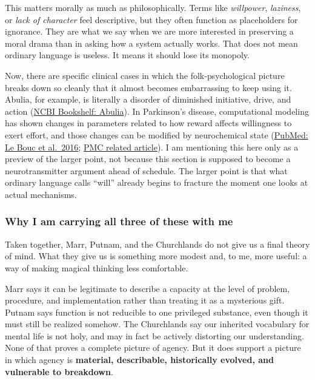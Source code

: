 This matters morally as much as philosophically. Terms like \emph{willpower}, \emph{laziness}, or \emph{lack of character} feel descriptive, but they often function as placeholders for ignorance. They are what we say when we are more interested in preserving a moral drama than in asking how a system actually works. That does not mean ordinary language is useless. It means it should lose its monopoly.

Now, there are specific clinical cases in which the folk-psychological picture breaks down so cleanly that it almost becomes embarrassing to keep using it. Abulia, for example, is literally a disorder of diminished initiative, drive, and action (\href{https://www.ncbi.nlm.nih.gov/books/NBK537093/}{NCBI Bookshelf: Abulia}). In Parkinson's disease, computational modeling has shown changes in parameters related to how reward affects willingness to exert effort, and those changes can be modified by neurochemical state (\href{https://pubmed.ncbi.nlm.nih.gov/27335396/}{PubMed: Le Bouc et al.~2016}; \href{https://pmc.ncbi.nlm.nih.gov/articles/PMC6601748/}{PMC related article}). I am mentioning this here only as a preview of the larger point, not because this section is supposed to become a neurotransmitter argument ahead of schedule. The larger point is that what ordinary language calls ``will'' already begins to fracture the moment one looks at actual mechanisms.

\subsubsection{Why I am carrying all three of these with me}\label{03_it_started-why-i-am-carrying-all-three-of-these-with-me}

Taken together, Marr, Putnam, and the Churchlands do not give us a final theory of mind. What they give us is something more modest and, to me, more useful: a way of making magical thinking less comfortable.

Marr says it can be legitimate to describe a capacity at the level of problem, procedure, and implementation rather than treating it as a mysterious gift. Putnam says function is not reducible to one privileged substance, even though it must still be realized somehow. The Churchlands say our inherited vocabulary for mental life is not holy, and may in fact be actively distorting our understanding. None of that proves a complete picture of agency. But it does support a picture in which agency is \textbf{material, describable, historically evolved, and vulnerable to breakdown}.


